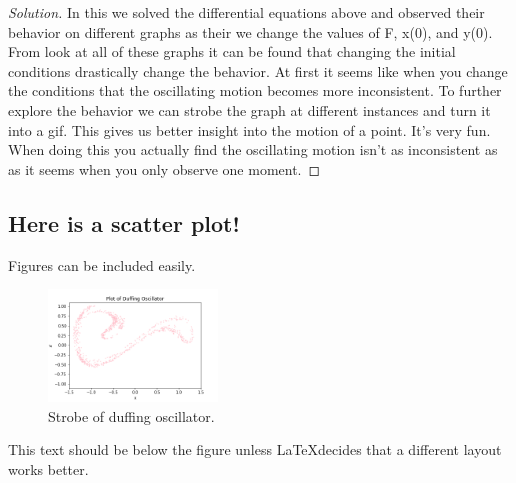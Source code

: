 \documentclass[aps,pra,notitlepage,amsmath,amssymb,letterpaper,12pt]{revtex4-1}
\newenvironment{solution}{\begin{proof}[Solution]}{\end{proof}}
\begin{document}
\begin{solution} %
In this we solved the differential equations above and observed their behavior on different graphs as their we change the values of F, x(0), and y(0).
From look at all of these graphs it can be found that changing the initial conditions drastically change the behavior. At first it seems like when you change the conditions that the oscillating motion becomes more inconsistent. To further explore the behavior we can strobe the graph at different instances and turn it into a gif. This gives us better insight into the motion of a point. It's very fun. When doing this you actually find the oscillating motion isn't as inconsistent as as it seems when you only observe one moment.
\end{solution}

\subsection{Here is a scatter plot!} %

Figures can be included easily.

\begin{figure}[h!] %
  \includegraphics[width=0.4\textwidth]{frame99.png}  %
  \caption{Strobe of duffing oscillator.}
  \label{fig:figlabel}
\end{figure}

This text should be below the figure unless \LaTeX  decides that a different layout works better.
 
 
\end{document}
